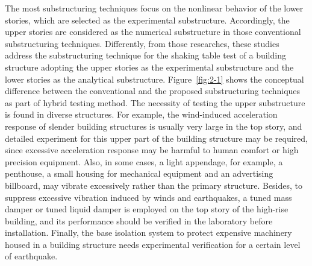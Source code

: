 The most substructuring techniques focus on the nonlinear behavior of the lower stories, which are selected as the experimental substructure. Accordingly, the upper stories are considered as the numerical substructure in those conventional substructuring techniques. Differently, from those researches, these studies address the substructuring technique for the shaking table test of a building structure adopting the upper stories as the experimental substructure and the lower stories as the analytical substructure. Figure~\ref{fig:2-1} shows the conceptual difference between the conventional and the proposed substructuring techniques as part of hybrid testing method. 
The necessity of testing the upper substructure is found in diverse structures. For example, the wind-induced acceleration response of slender building structures is usually very large in the top story, and detailed experiment for this upper part of the building structure may be required, since excessive acceleration response may be harmful to human comfort or high precision equipment. Also, in some cases, a light appendage, for example, a penthouse, a small housing for mechanical equipment and an advertising billboard, may vibrate excessively rather than the primary structure. Besides, to suppress excessive vibration induced by winds and earthquakes, a tuned mass damper or tuned liquid damper is employed on the top story of the high-rise building, and its performance should be verified in the laboratory before installation. Finally, the base isolation system to protect expensive machinery housed in a building structure needs experimental verification for a certain level of earthquake.

